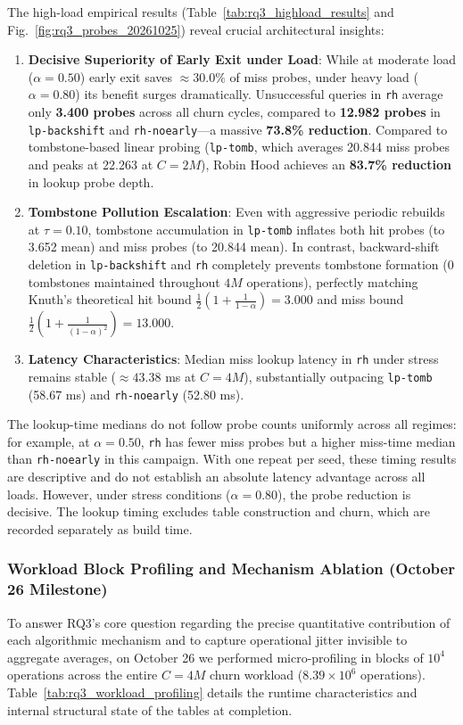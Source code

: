 \documentclass[conference]{IEEEtran}
\begin{document}
The high-load empirical results (Table~\ref{tab:rq3_highload_results} and Fig.~\ref{fig:rq3_probes_20261025}) reveal crucial architectural insights:
\begin{enumerate}
    \item \textbf{Decisive Superiority of Early Exit under Load}: While at moderate load ($\alpha = 0.50$) early exit saves $\approx 30.0\%$ of miss probes, under heavy load ($\alpha = 0.80$) its benefit surges dramatically. Unsuccessful queries in \texttt{rh} average only \textbf{3.400 probes} across all churn cycles, compared to \textbf{12.982 probes} in \texttt{lp-backshift} and \texttt{rh-noearly}---a massive \textbf{73.8\% reduction}. Compared to tombstone-based linear probing (\texttt{lp-tomb}, which averages 20.844 miss probes and peaks at 22.263 at $C = 2M$), Robin Hood achieves an \textbf{83.7\% reduction} in lookup probe depth.
    \item \textbf{Tombstone Pollution Escalation}: Even with aggressive periodic rebuilds at $\tau = 0.10$, tombstone accumulation in \texttt{lp-tomb} inflates both hit probes (to 3.652 mean) and miss probes (to 20.844 mean). In contrast, backward-shift deletion in \texttt{lp-backshift} and \texttt{rh} completely prevents tombstone formation (0 tombstones maintained throughout $4M$ operations), perfectly matching Knuth's theoretical hit bound $\frac{1}{2}(1 + \frac{1}{1-\alpha}) = 3.000$ and miss bound $\frac{1}{2}(1 + \frac{1}{(1-\alpha)^2}) = 13.000$.
    \item \textbf{Latency Characteristics}: Median miss lookup latency in \texttt{rh} under stress remains stable ($\approx 43.38$ ms at $C=4M$), substantially outpacing \texttt{lp-tomb} (58.67 ms) and \texttt{rh-noearly} (52.80 ms).
\end{enumerate}

The lookup-time medians do not follow probe counts uniformly across all regimes: for example,
at $\alpha=0.50$, \texttt{rh} has fewer miss probes but a higher miss-time median than
\texttt{rh-noearly} in this campaign. With one repeat per seed, these timing
results are descriptive and do not establish an absolute latency advantage across all loads.
However, under stress conditions ($\alpha=0.80$), the probe reduction is decisive.
The lookup timing excludes table construction and churn, which are recorded
separately as build time.

\subsubsection{Workload Block Profiling and Mechanism Ablation (October 26 Milestone)}
To answer RQ3's core question regarding the precise quantitative contribution of each algorithmic mechanism and to capture operational jitter invisible to aggregate averages, on October 26 we performed micro-profiling in blocks of $10^4$ operations across the entire $C = 4M$ churn workload ($8.39 \times 10^6$ operations). Table~\ref{tab:rq3_workload_profiling} details the runtime characteristics and internal structural state of the tables at completion.
\end{document}
